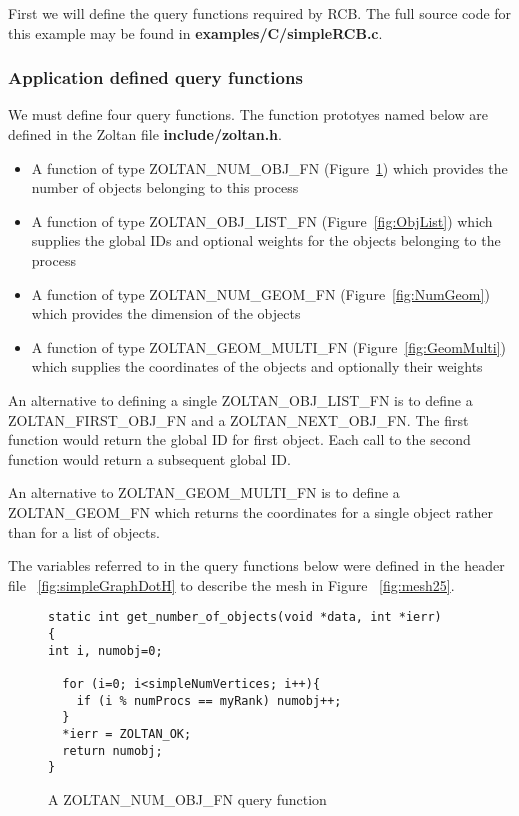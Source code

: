 First we will define the query functions required by RCB.
The full source code for this example may be found in
\textbf{examples/C/simpleRCB.c}.

\subsubsection{Application defined query functions}

We must define four query functions.  The function prototyes named 
below are defined in the Zoltan file \textbf{include/zoltan.h}.

\begin{itemize}
\item A function of type ZOLTAN\_NUM\_OBJ\_FN (Figure~\ref{fig:NumObj}) which provides the number of objects belonging to this process 
\item A function of type ZOLTAN\_OBJ\_LIST\_FN (Figure~\ref{fig:ObjList}) which supplies the global IDs and optional weights for the objects belonging to the process
\item A function of type ZOLTAN\_NUM\_GEOM\_FN (Figure~\ref{fig:NumGeom}) which provides the dimension of the objects
\item A function of type ZOLTAN\_GEOM\_MULTI\_FN (Figure~\ref{fig:GeomMulti}) which supplies the coordinates of the objects and optionally their weights
\end{itemize}

An alternative to defining a single ZOLTAN\_OBJ\_LIST\_FN is to define
a ZOLTAN\_FIRST\_OBJ\_FN and a ZOLTAN\_NEXT\_OBJ\_FN.  The first function
would return the global ID for first object.  Each call to the second function would
return a subsequent global ID.

An alternative to ZOLTAN\_GEOM\_MULTI\_FN is to define a ZOLTAN\_GEOM\_FN which
returns the coordinates for a single object rather than for a list
of objects.

The variables referred to in the query functions below were defined in the header
file ~\ref{fig:simpleGraphDotH} to describe the mesh in Figure ~\ref{fig:mesh25}.


\begin{figure}
\begin{flushleft}
\begin{verbatim}
static int get_number_of_objects(void *data, int *ierr)
{
int i, numobj=0;

  for (i=0; i<simpleNumVertices; i++){
    if (i % numProcs == myRank) numobj++;
  }
  *ierr = ZOLTAN_OK;
  return numobj;
}
\end{verbatim}
\end{flushleft}
\caption{A ZOLTAN\_NUM\_OBJ\_FN query function}
\label{fig:NumObj}
\end{figure}

